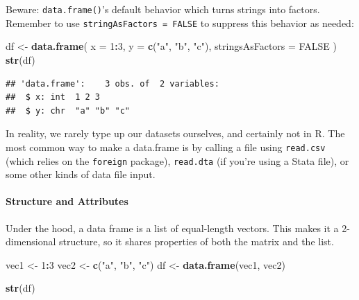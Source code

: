 \documentclass[
]{book}
\newenvironment{Shaded}{\begin{snugshade}}{\end{snugshade}}
\newcommand{\AttributeTok}[1]{\textcolor[rgb]{0.13,0.29,0.53}{#1}}
\newcommand{\ConstantTok}[1]{\textcolor[rgb]{0.56,0.35,0.01}{#1}}
\newcommand{\DecValTok}[1]{\textcolor[rgb]{0.00,0.00,0.81}{#1}}
\newcommand{\FunctionTok}[1]{\textcolor[rgb]{0.13,0.29,0.53}{\textbf{#1}}}
\newcommand{\NormalTok}[1]{#1}
\newcommand{\OtherTok}[1]{\textcolor[rgb]{0.56,0.35,0.01}{#1}}
\newcommand{\SpecialCharTok}[1]{\textcolor[rgb]{0.81,0.36,0.00}{\textbf{#1}}}
\newcommand{\StringTok}[1]{\textcolor[rgb]{0.31,0.60,0.02}{#1}}
\begin{document}
Beware: \texttt{data.frame()}'s default behavior which turns strings into factors. Remember to use \texttt{stringAsFactors\ =\ FALSE} to suppress this behavior as needed:

\begin{Shaded}
\begin{Highlighting}[]
\NormalTok{df }\OtherTok{\textless{}{-}} \FunctionTok{data.frame}\NormalTok{(}
  \AttributeTok{x =} \DecValTok{1}\SpecialCharTok{:}\DecValTok{3}\NormalTok{,}
  \AttributeTok{y =} \FunctionTok{c}\NormalTok{(}\StringTok{"a"}\NormalTok{, }\StringTok{"b"}\NormalTok{, }\StringTok{"c"}\NormalTok{),}
  \AttributeTok{stringsAsFactors =} \ConstantTok{FALSE}
\NormalTok{)}
\FunctionTok{str}\NormalTok{(df)}
\end{Highlighting}
\end{Shaded}

\begin{verbatim}
## 'data.frame':    3 obs. of  2 variables:
##  $ x: int  1 2 3
##  $ y: chr  "a" "b" "c"
\end{verbatim}

In reality, we rarely type up our datasets ourselves, and certainly not in R. The most common way to make a data.frame is by calling a file using \texttt{read.csv} (which relies on the \texttt{foreign} package), \texttt{read.dta} (if you're using a Stata file), or some other kinds of data file input.

\paragraph{Structure and Attributes}\label{structure-and-attributes}

Under the hood, a data frame is a list of equal-length vectors. This makes it a 2-dimensional structure, so it shares properties of both the matrix and the list.

\begin{Shaded}
\begin{Highlighting}[]
\NormalTok{vec1 }\OtherTok{\textless{}{-}} \DecValTok{1}\SpecialCharTok{:}\DecValTok{3}
\NormalTok{vec2 }\OtherTok{\textless{}{-}} \FunctionTok{c}\NormalTok{(}\StringTok{"a"}\NormalTok{, }\StringTok{"b"}\NormalTok{, }\StringTok{"c"}\NormalTok{)}
\NormalTok{df }\OtherTok{\textless{}{-}} \FunctionTok{data.frame}\NormalTok{(vec1, vec2)}

\FunctionTok{str}\NormalTok{(df)}
\end{Highlighting}
\end{Shaded}
\end{document}
